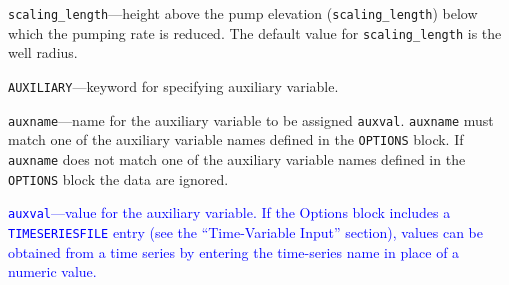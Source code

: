 \begin{description}
\item \texttt{scaling\_length}---height above the pump elevation (\texttt{scaling\_length}) below which the pumping rate is reduced.  The default value for \texttt{scaling\_length} is the well radius.

\item \texttt{AUXILIARY}---keyword for specifying auxiliary variable.

\item \texttt{auxname}---name for the auxiliary variable to be assigned \texttt{auxval}.  \texttt{auxname} must match one of the auxiliary variable names defined in the \texttt{OPTIONS} block. If \texttt{auxname} does not match one of the auxiliary variable names defined in the \texttt{OPTIONS} block the data are ignored.

\item \textcolor{blue}{\texttt{auxval}---value for the auxiliary variable. If the Options block includes a \texttt{TIMESERIESFILE} entry (see the ``Time-Variable Input'' section), values can be obtained from a time series by entering the time-series name in place of a numeric value.}

\end{description}

